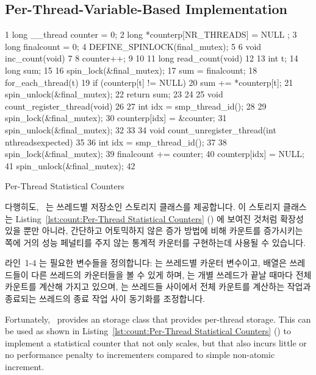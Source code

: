 \subsection{Per-Thread-Variable-Based Implementation}
\label{sec:count:Per-Thread-Variable-Based Implementation}

\begin{listing}[tb]
{ \scriptsize
\begin{verbbox}
  1 long __thread counter = 0;
  2 long *counterp[NR_THREADS] = { NULL };
  3 long finalcount = 0;
  4 DEFINE_SPINLOCK(final_mutex);
  5 
  6 void inc_count(void)
  7 {
  8   counter++;
  9 }
 10 
 11 long read_count(void)
 12 {
 13   int t;
 14   long sum;
 15 
 16   spin_lock(&final_mutex);
 17   sum = finalcount;
 18   for_each_thread(t)
 19     if (counterp[t] != NULL)
 20       sum += *counterp[t];
 21   spin_unlock(&final_mutex);
 22   return sum;
 23 }
 24 
 25 void count_register_thread(void)
 26 {
 27   int idx = smp_thread_id();
 28 
 29   spin_lock(&final_mutex);
 30   counterp[idx] = &counter;
 31   spin_unlock(&final_mutex);
 32 }
 33 
 34 void count_unregister_thread(int nthreadsexpected)
 35 {
 36   int idx = smp_thread_id();
 37 
 38   spin_lock(&final_mutex);
 39   finalcount += counter;
 40   counterp[idx] = NULL;
 41   spin_unlock(&final_mutex);
 42 }
\end{verbbox}
}
\centering
\theverbbox
\caption{Per-Thread Statistical Counters}
\label{lst:count:Per-Thread Statistical Counters}
\end{listing}

다행히도, \GCC\ 는 쓰레드별 저장소인  스토리지 클래스를
제공합니다.
이 스토리지 클래스는
Listing~\ref{lst:count:Per-Thread Statistical Counters} ()
에 보여진 것처럼 확장성 있을 뿐만 아니라, 간단하고 어토믹하지 않은 증가 방법에
비해 카운트를 증가시키는 쪽에 거의 성능 페널티를 주지 않는 통계적 카운터를
구현하는데 사용될 수 있습니다.

라인~1-4 는 필요한 변수들을 정의합니다:  는 쓰레드별 카운터
변수이고,  배열은 쓰레드들이 다른 쓰레드의 카운터들을 볼 수 있게
하며,  는 개별 쓰레드가 끝날 때마다 전체 카운트를 계산해 가지고
있으며,  는 쓰레드들 사이에서 전체 카운트를 계산하는 작업과
종료되는 쓰레드의 종료 작업 사이 동기화를 조정합니다.
\iffalse

Fortunately, \GCC\ provides an  storage class that provides
per-thread storage.
This can be used as shown in
Listing~\ref{lst:count:Per-Thread Statistical Counters} ()
to implement
a statistical counter that not only scales, but that also incurs little
or no performance penalty to incrementers compared to simple non-atomic
increment.

